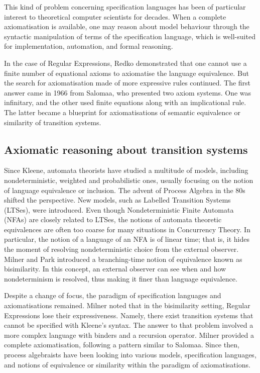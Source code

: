 This kind of problem concerning specification languages has been of particular interest to theoretical computer scientists for decades. When a complete axiomatisation is available, one may reason about model behaviour through the syntactic manipulation of terms of the specification language, which is well-suited for implementation, automation, and formal reasoning.

In the case of Regular Expressions, Redko demonstrated that one cannot use a finite number of equational axioms to axiomatise the language equivalence. But the search for axiomatisation made of more expressive rules continued. The first answer came in 1966 from Salomaa, who presented two axiom systems. One was infinitary, and the other used finite equations along with an implicational rule. The latter became a blueprint for axiomatisations of semantic equivalence or similarity of transition systems.
\subsection{Axiomatic reasoning about transition systems}
Since Kleene, automata theorists have studied a multitude of models, including nondeterministic, weighted and probabilistic ones, usually focusing on the notion of language equivalence or inclusion. The advent of Process Algebra in the 80s shifted the perspective. New models, such as Labelled Transition Systems (LTSes), were introduced. Even though Nondeterministic Finite Automata (NFAs) are closely related to LTSes, the notions of automata theoretic equivalences are often too coarse for many situations in Concurrency Theory. In particular, the notion of a language of an NFA is of linear time; that is, it hides the moment of resolving nondeterministic choice from the external observer. Milner and Park introduced a branching-time notion of equivalence known as bisimilarity. In this concept, an external observer can see when and how nondeterminism is resolved, thus making it finer than language equivalence. 

Despite a change of focus, the paradigm of specification languages and axiomatisations remained. Milner noted that in the bisimilarity setting, Regular Expressions lose their expressiveness. Namely, there exist transition systems that cannot be specified with Kleene's syntax. The answer to that problem involved a more complex language with binders and a recursion operator. Milner provided a complete axiomatisation, following a pattern similar to Salomaa. Since then, process algebraists have been looking into various models, specification languages, and notions of equivalence or similarity within the paradigm of axiomatisations. 

